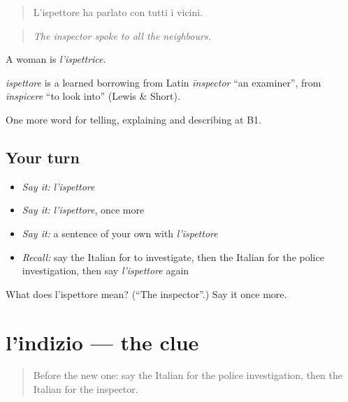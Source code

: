 \begin{quote}
L'ispettore ha parlato con tutti i vicini.
\end{quote}

\begin{quote}
\emph{The inspector spoke to all the neighbours.}
\end{quote}

A woman is \emph{l'ispettrice}.

\begin{cousinweb}
\emph{ispettore} is a learned borrowing from Latin \emph{īnspector} \textquotedblleft{}an examiner\textquotedblright{}, from \emph{īnspicere} \textquotedblleft{}to look into\textquotedblright{} (Lewis \& Short).
\end{cousinweb}

\begin{grammarlens}[title={What you've built}]
One more word for telling, explaining and describing at B1.
\end{grammarlens}

\subsection*{Your turn}
\begin{itemize}
\raggedright
  \item \emph{Say it:} \emph{l'ispettore}
  \item \emph{Say it:} \emph{l'ispettore}, once more
  \item \emph{Say it:} a sentence of your own with \emph{l'ispettore}
  \item \emph{Recall:} say the Italian for to investigate, then the Italian for the police investigation, then say \emph{l'ispettore} again
\end{itemize}

\begin{tcolorbox}[breakable,colback=teal!4,colframe=teal!35!black,title={Before you move on}]
What does l'ispettore mean? (\textquotedblleft{}The inspector\textquotedblright{}.) Say it once more.
\end{tcolorbox}
\section[l'indizio]{l'indizio — the clue}

\label{lesson:IT-C295-indizio}



\begin{quote}
Before the new one: say the Italian for the police investigation, then the Italian for the inspector.
\end{quote}

